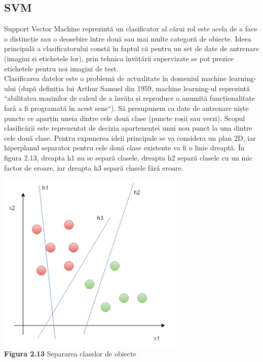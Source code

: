 \documentclass[a4paper,12pt]{report}
\newcommand\tab[1][1cm]{\hspace*{#1}}
\begin{document}
\subsection{SVM}
\tab Support Vector Machine\cite{wikip2, wikip3, sklearn} reprezintă un clasificator al cărui rol este acela de a face o distincție sau o deosebire între două sau mai multe categorii de obiecte. Ideea principală a clasificatorului constă în faptul că pentru un set de date de antrenare (imagini și etichetele lor), prin tehnica învățării supervizate se pot prezice etichetele pentru noi imagini de test.
\\ \tab Clasificarea datelor este o problemă de actualitate în domeniul machine learning-ului (după definiția lui Arthur Samuel din 1959, machine learning-ul reprezintă ``abilitatea mașinilor de calcul de a învăța și reproduce o anumită funcționalitate
fară a fi programată în acest sens``). Să presupunem ca date de antrenare niște puncte ce aparțin uneia dintre cele două clase (puncte roșii sau verzi). Scopul clasificării este reprezentat de decizia apartenenței unui nou punct la una dintre cele două clase. Pentru expunerea ideii principale se va considera un plan 2D, iar hiperplanul separator pentru cele două clase existente va fi o linie dreaptă. În figura 2.13, dreapta h1 nu se separă clasele, dreapta h2 separă clasele cu un mic factor de eroare, iar dreapta h3 separă clasele fără eroare.
\begin {center} 
	\begin {footnotesize} 
		\includegraphics[width = 90mm]{fig2_13} \\
		\textbf  {Figura 2.13} Separarea claselor de obiecte
	\end {footnotesize} 
\end {center}
\end{document}
